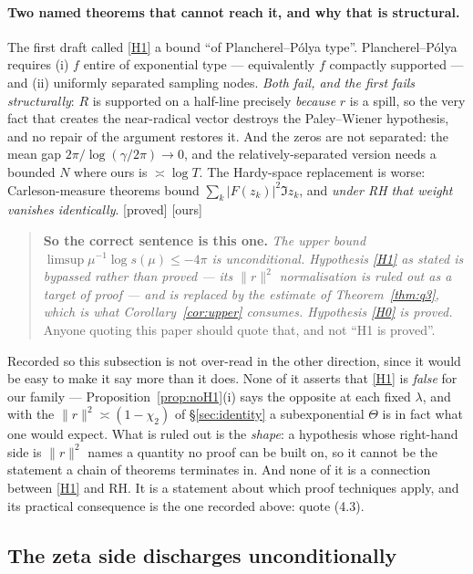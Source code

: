 \documentclass[11pt,a4paper]{article}
\makeatletter
\theoremstyle{plain}
\theoremstyle{definition}
\theoremstyle{remark}
\newcommand{\st}[1]{{\normalfont\sffamily\footnotesize[#1]}}
\newcommand{\proved}{\st{proved}}
\newcommand{\ours}{{\normalfont\sffamily\footnotesize[ours]}}
\newcommand{\widecheck}[1]{{\mathpalette\wc@check{#1}}}
\newcommand{\wc@check}[2]{%
  \setbox\z@\hbox{$\m@th#1#2$}%
  \setbox\tw@\hbox{$\m@th#1\widehat{\phantom{#2}}$}%
  \setbox\thr@@\hbox{$\m@th#1x$}%
  \dimen@\ht\tw@ \advance\dimen@\ht\z@ \advance\dimen@.4\ht\thr@@
  \hbox{\rlap{\raise\dimen@\hbox{\scalebox{1}[-1]{\box\tw@}}}\box\z@}%
}
\def\widecheck#1{#1}%
\makeatother
\begin{document}
\paragraph{Two named theorems that cannot reach it, and why that is structural.}
The first draft called \eqref{H1} a bound ``of Plancherel--P\'olya type''.
Plancherel--P\'olya requires (i) $f$ entire of exponential type --- equivalently
$\widecheck f$ compactly supported --- and (ii) uniformly separated sampling
nodes.  \emph{Both fail, and the first fails structurally}: $R$ is supported on
a half-line precisely \emph{because} $r$ is a spill, so the very fact that
creates the near-radical vector destroys the Paley--Wiener hypothesis, and no
repair of the argument restores it.  And the zeros are not separated: the mean
gap $2\pi/\log(\gamma/2\pi)\to0$, and the relatively-separated version needs a
bounded $N$ where ours is $\asymp\log T$.  The Hardy-space replacement is worse:
Carleson-measure theorems bound $\sum_k|F(z_k)|^2\Im z_k$, and \emph{under RH
that weight vanishes identically}.  \proved{} \ours

\begin{quote}
\textbf{So the correct sentence is this one.}  \emph{The upper bound
$\limsup\mu^{-1}\log s(\mu)\le-4\pi$ is unconditional.  Hypothesis \eqref{H1} as
stated is bypassed rather than proved --- its $\|r\|^2$ normalisation is ruled
out as a target of proof --- and is replaced by the estimate of
Theorem~\ref{thm:q3}, which is what Corollary~\ref{cor:upper} consumes.
Hypothesis \eqref{H0} is proved.}  Anyone quoting this paper should quote that,
and not ``H1 is proved''.
\end{quote}

Recorded so this subsection is not over-read in the other direction, since it
would be easy to make it say more than it does.  None of it asserts that
\eqref{H1} is \emph{false} for our family --- Proposition~\ref{prop:noH1}(i)
says the opposite at each fixed $\lambda$, and with the $\|r\|^2\asymp(1-\chi_2)$
of \S\ref{sec:identity} a subexponential $\Theta$ is in fact what one would
expect.  What is ruled out is the \emph{shape}: a hypothesis whose right-hand
side is $\|r\|^2$ names a quantity no proof can be built on, so it cannot be the
statement a chain of theorems terminates in.  And none of it is a connection
between \eqref{H1} and RH.  It is a statement about which proof techniques
apply, and its practical consequence is the one recorded above: quote (4.3).

\subsection{The zeta side discharges unconditionally}
\label{sec:zetaside}
\end{document}
